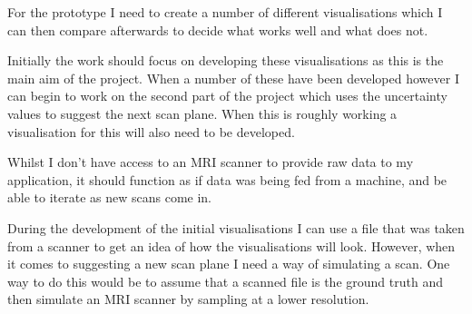 \documentclass[
  oneside,
  11pt, a4paper,
  footinclude=true,
  headinclude=true,
  cleardoublepage=empty
]{scrbook}
\begin{document}
For the prototype I need to create a number of different visualisations which I can then compare afterwards to decide what works well and what does not.

Initially the work should focus on developing these visualisations as this is the main aim of the project. When a number of these have been developed however I can begin to work on the second part of the project which uses the uncertainty values to suggest the next scan plane. When this is roughly working a visualisation for this will also need to be developed.

Whilst I don’t have access to an MRI scanner to provide raw data to my application, it should function as if data was being fed from a machine, and be able to iterate as new scans come in.

During the development of the initial visualisations I can use a file that was taken from a scanner to get an idea of how the visualisations will look. However, when it comes to suggesting a new scan plane I need a way of simulating a scan. One way to do this would be to assume that a scanned file is the ground truth and then simulate an MRI scanner by sampling at a lower resolution.
\end{document}
